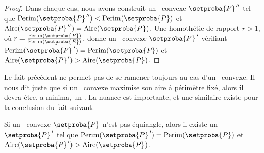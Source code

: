 \begin{proof}
	Dans chaque cas, nous avons construit un \ngone\ convexe $\dbleprimeit{\setproba{P}}$ tel que
	$\perim{\dbleprimeit{\setproba{P}}} < \perim{\setproba{P}}$
	et
	$\area{\dbleprimeit{\setproba{P}}} = \area{\setproba{P}}$.
	Une homothétie de rapport $r > 1$, où $r = \frac{ \perim{\setproba{P}} }{ \perim{\setproba{E}} }$, donne un \ngone\ convexe $\primeit{\setproba{P}}$ vérifiant
	$\perim{\primeit{\setproba{P}}} = \perim{\setproba{P}}$
	et
	$\area{\primeit{\setproba{P}}} > \area{\setproba{P}}$.
\end{proof}


\begin{remark}
	Le fait précédent ne permet pas de se ramener toujours au cas d'un \nequi\ convexe. Il nous dit juste que si un \ngone\ convexe maximise son aire à périmètre fixé, alors il devra être, a minima, un \nequi. La nuance est importante, et une similaire existe pour la conclusion du fait suivant.
\end{remark}




\begin{fact} \label{must-be-reg}
	Si un \nequi\ convexe $\setproba{P}$ n'est pas équiangle,
	alors il existe un \ngone\ $\primeit{\setproba{P}}$ tel que
	$\perim{\primeit{\setproba{P}}} = \perim{\setproba{P}}$
	et
	$\area{\primeit{\setproba{P}}} > \area{\setproba{P}}$.
\end{fact}


